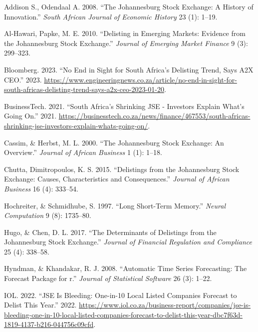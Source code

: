 \documentclass[
]{article}
\newlength{\cslhangindent}
\newlength{\cslentryspacingunit} %
\newenvironment{CSLReferences}[2] %
 {%
  \setlength{\parindent}{0pt}
  \ifodd #1
  \let\oldpar\par
  \def\par{\hangindent=\cslhangindent\oldpar}
  \fi
  \setlength{\parskip}{#2\cslentryspacingunit}
 }%
 {}
\begin{document}
\hypertarget{refs}{}
\begin{CSLReferences}{1}{0}
\leavevmode{}%
Addison S., Odendaal A. 2008. {``The Johannesburg Stock Exchange: A
History of Innovation.''} \emph{South African Journal of Economic
History} 23 (1): 1--19.

\leavevmode{}%
Al-Hawari, Papke, M. E. 2010. {``Delisting in Emerging Markets: Evidence
from the Johannesburg Stock Exchange.''} \emph{Journal of Emerging
Market Finance} 9 (3): 299--323.

\leavevmode{}%
Bloomberg. 2023. {``No End in Sight for South Africa's Delisting Trend,
Says A2X CEO.''} 2023.
\url{https://www.engineeringnews.co.za/article/no-end-in-sight-for-south-africas-delisting-trend-says-a2x-ceo-2023-01-20}.

\leavevmode{}%
BusinessTech. 2021. {``South Africa's Shrinking JSE - Investors Explain
What's Going On.''} 2021.
\url{https://businesstech.co.za/news/finance/467553/south-africas-shrinking-jse-investors-explain-whats-going-on/}.

\leavevmode{}%
Cassim, \& Herbst, M. L. 2000. {``The Johannesburg Stock Exchange: An
Overview.''} \emph{Journal of African Business} 1 (1): 1--18.

\leavevmode{}%
Chutta, Dimitropoulos, K. S. 2015. {``Delistings from the Johannesburg
Stock Exchange: Causes, Characteristics and Consequences.''}
\emph{Journal of African Business} 16 (4): 333--54.

\leavevmode{}%
Hochreiter, \& Schmidhube, S. 1997. {``Long Short-Term Memory.''}
\emph{Neural Computation} 9 (8): 1735--80.

\leavevmode{}%
Hugo, \& Chen, D. L. 2017. {``The Determinants of Delistings from the
Johannesburg Stock Exchange.''} \emph{Journal of Financial Regulation
and Compliance} 25 (4): 338--58.

\leavevmode{}%
Hyndman, \& Khandakar, R. J. 2008. {``Automatic Time Series Forecasting:
The Forecast Package for r.''} \emph{Journal of Statistical Software} 26
(3): 1--22.

\leavevmode{}%
IOL. 2022. {``JSE Is Bleeding: One-in-10 Local Listed Companies Forecast
to Delist This Year.''} 2022.
\url{https://www.iol.co.za/business-report/companies/jse-is-bleeding-one-in-10-local-listed-companies-forecast-to-delist-this-year-dbc7f63d-1819-4137-b216-044756c09cfd}.


\end{CSLReferences}
\end{document}
